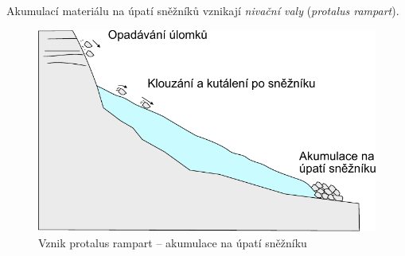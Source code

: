 Akumulací materiálu na úpatí sněžníků vznikají \emph{nivační valy} (\textit{protalus rampart}).
\begin{figure}
	\centering
	\includegraphics[width=1\linewidth]{obrazky/periglac/protalus_rampart}
	\caption{Vznik protalus rampart -- akumulace na úpatí sněžníku}
	\label{fig:protalusrampart}
\end{figure}
